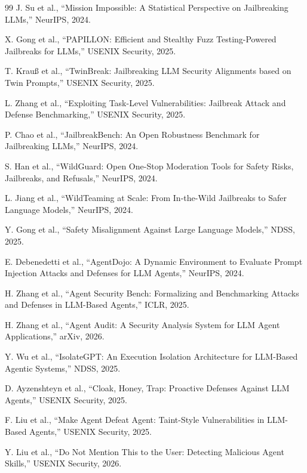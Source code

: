 \documentclass[11pt,a4paper,onecolumn]{article}
\begin{document}
\begin{thebibliography}{99}
J. Su et al., ``Mission Impossible: A Statistical Perspective on Jailbreaking LLMs,'' NeurIPS, 2024.

X. Gong et al., ``PAPILLON: Efficient and Stealthy Fuzz Testing-Powered Jailbreaks for LLMs,'' USENIX Security, 2025.

T. Krauß et al., ``TwinBreak: Jailbreaking LLM Security Alignments based on Twin Prompts,'' USENIX Security, 2025.

L. Zhang et al., ``Exploiting Task-Level Vulnerabilities: Jailbreak Attack and Defense Benchmarking,'' USENIX Security, 2025.

P. Chao et al., ``JailbreakBench: An Open Robustness Benchmark for Jailbreaking LLMs,'' NeurIPS, 2024.

S. Han et al., ``WildGuard: Open One-Stop Moderation Tools for Safety Risks, Jailbreaks, and Refusals,'' NeurIPS, 2024.

L. Jiang et al., ``WildTeaming at Scale: From In-the-Wild Jailbreaks to Safer Language Models,'' NeurIPS, 2024.

Y. Gong et al., ``Safety Misalignment Against Large Language Models,'' NDSS, 2025.

E. Debenedetti et al., ``AgentDojo: A Dynamic Environment to Evaluate Prompt Injection Attacks and Defenses for LLM Agents,'' NeurIPS, 2024.

H. Zhang et al., ``Agent Security Bench: Formalizing and Benchmarking Attacks and Defenses in LLM-Based Agents,'' ICLR, 2025.

H. Zhang et al., ``Agent Audit: A Security Analysis System for LLM Agent Applications,'' arXiv, 2026.

Y. Wu et al., ``IsolateGPT: An Execution Isolation Architecture for LLM-Based Agentic Systems,'' NDSS, 2025.

D. Ayzenshteyn et al., ``Cloak, Honey, Trap: Proactive Defenses Against LLM Agents,'' USENIX Security, 2025.

F. Liu et al., ``Make Agent Defeat Agent: Taint-Style Vulnerabilities in LLM-Based Agents,'' USENIX Security, 2025.

Y. Liu et al., ``Do Not Mention This to the User: Detecting Malicious Agent Skills,'' USENIX Security, 2026.


\end{thebibliography}
\end{document}
